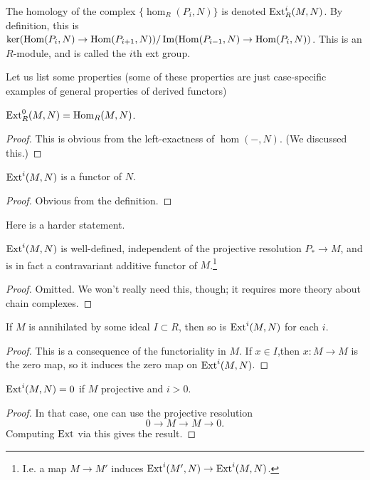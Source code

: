 \begin{definition} 
The homology of the complex $\{\hom_R(P_i, N)\}$ is denoted
$\mathrm{Ext}^i_R(M,N)$. By
definition, this is $\ker(\operatorname{Hom}(P_i,N) \to \operatorname{Hom}(P_{i+1},
N))/\operatorname{Im}(\operatorname{Hom}(P_{i-1},
N) \to \operatorname{Hom}(P_i,N))$. This is an $R$-module, and is called the
$i$th ext group.
\end{definition} 



Let us list some properties (some of these properties are just
case-specific examples of general properties of derived
functors)

\begin{proposition} 
$\mathrm{Ext}_R^0(M,N) = \operatorname{Hom}_R(M,N)$. 
\end{proposition} 
\begin{proof} 
This is obvious from the left-exactness of $\hom(-,N)$. (We
discussed this.)
\end{proof} 

\begin{proposition} 
$\mathrm{Ext}^i(M,N)$ is a functor of $N$.
\end{proposition} 
\begin{proof} 
Obvious from the definition.
\end{proof} 

Here is a harder statement.
\begin{proposition} 
$\mathrm{Ext}^i(M,N)$ is well-defined, independent of the projective
resolution $P_*
\to M$, and is in fact a contravariant additive functor of
$M$.\footnote{I.e. a map $M
\to M'$ induces $\mathrm{Ext}^i(M', N) \to \mathrm{Ext}^i(M,N)$.}
\end{proposition} 
\begin{proof} 
Omitted. We won't really need this, though; it requires more
theory about
chain complexes.
\end{proof} 


\begin{proposition} 
If $M$ is annihilated by some ideal $I \subset R$, then so is
$\mathrm{Ext}^i(M,N)$ for
each $i$.
\end{proposition} 
\begin{proof} 
This is a consequence of the functoriality in $M$. If $x \in
I$,then $x: M \to
M$ is the zero map, so it induces the zero map on
$\mathrm{Ext}^i(M,N)$.\end{proof}

\begin{proposition} 
$\mathrm{Ext}^i(M,N) = 0$ if $M$ projective and $i>0$.
\end{proposition} 
\begin{proof} 
In that case, one can use the projective resolution
\[ 0 \to M \to M \to 0.  \]
Computing $\mathrm{Ext}$ via this gives the result.
\end{proof} 




